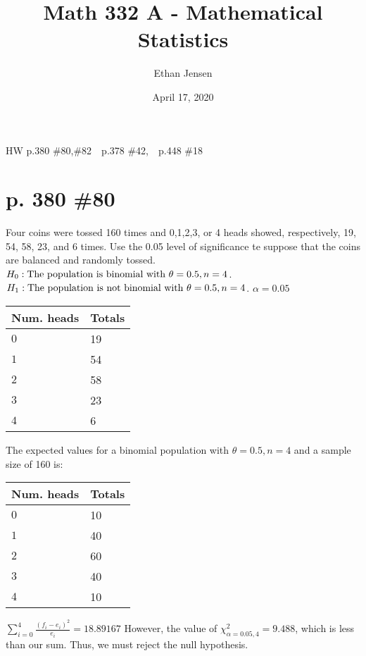 \documentclass[12pt]{article}
\title{Math 332 A - Mathematical Statistics}
\author{Ethan Jensen}
\date{April 17, 2020}
\begin{document}
\maketitle HW p.380 \#80,\#82\ \ p.378 \#42,\ \ p.448 \#18
	\section[20pt]{p. 380 \#80}
Four coins were tossed 160 times and 0,1,2,3, or 4 heads showed, respectively, 19, 54, 58, 23, and 6 times. Use the 0.05 level of significance te suppose that the coins are balanced and randomly tossed.
\newline \newline
\(H_0: \textup{The population is binomial with } \theta = 0.5, n = 4\).
\newline
\(H_1: \textup{The population is not binomial with } \theta = 0.5, n = 4\).
\newline
\(\alpha = 0.05\)
\newline
\begin{tabular}{|p{3cm}|p{2cm}|}
    \hline
    \textbf{Num. heads} & \textbf{Totals} \\
    \hline
    \(0\) & 19 \\
    \hline
    \(1\) & 54 \\
    \hline
    \(2\) & 58 \\
    \hline
    \(3\) & 23 \\
    \hline
    \(4\) & 6 \\
    \hline
\end{tabular}
\newline
The expected values for a binomial population with \(\theta = 0.5, n = 4\) and a sample size of 160 is:
\newline
\begin{tabular}{|p{3cm}|p{2cm}|}
    \hline
    \textbf{Num. heads} & \textbf{Totals} \\
    \hline
    \(0\) & 10 \\
    \hline
    \(1\) & 40 \\
    \hline
    \(2\) & 60 \\
    \hline
    \(3\) & 40 \\
    \hline
    \(4\) & 10 \\
    \hline
\end{tabular}
\newline
\(\sum_{i=0}^4\frac{(f_i-e_i)^2}{e_i} = 18.89167\)
\newline
However, the value of \(\chi^2_{\alpha = 0.05, 4} = 9.488\), which is less than our sum.
\newline
Thus, we must reject the null hypothesis.
\newline
\newline
{}
\newpage
\end{document}
